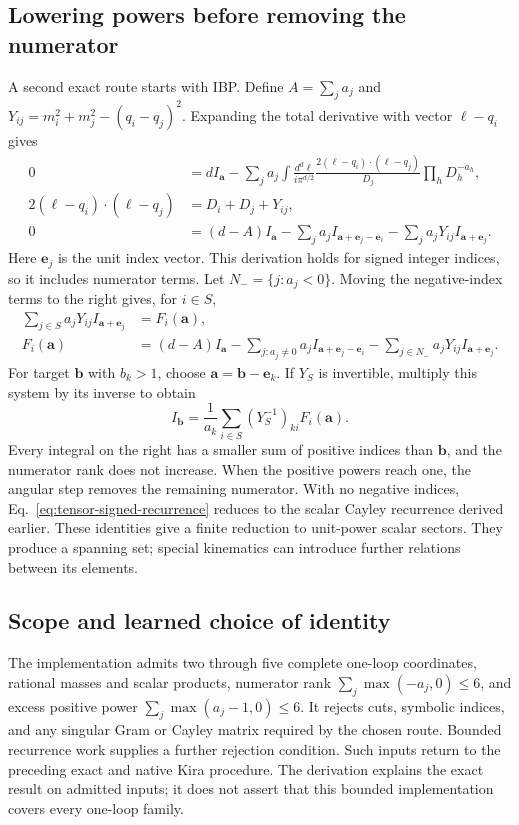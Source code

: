 \subsection{Lowering powers before removing the numerator}
A second exact route starts with IBP. Define $A=\sum_j a_j$ and $Y_{ij}=m_i^2+m_j^2-(q_i-q_j)^2$. Expanding the total derivative with vector $\ell-q_i$ gives
\begin{align}
 0&=d I_{\boldsymbol a}
 -\sum_j a_j\int\frac{d^d\ell}{i\pi^{d/2}}
 \frac{2(\ell-q_i)\cdot(\ell-q_j)}{D_j}\prod_hD_h^{-a_h},\\
 2(\ell-q_i)\cdot(\ell-q_j)&=D_i+D_j+Y_{ij},\\
 0&=(d-A)I_{\boldsymbol a}
 -\sum_j a_j I_{\boldsymbol a+\boldsymbol e_j-\boldsymbol e_i}
 -\sum_j a_jY_{ij}I_{\boldsymbol a+\boldsymbol e_j}.
 \label{eq:tensor-ibp}
\end{align}
Here $\boldsymbol e_j$ is the unit index vector. This derivation holds for signed integer indices, so it includes numerator terms. Let $N_- =\{j:a_j<0\}$. Moving the negative-index terms to the right gives, for $i\in S$,
\begin{align}
 \sum_{j\in S}a_jY_{ij}I_{\boldsymbol a+\boldsymbol e_j}&=F_i(\boldsymbol a),\\
 F_i(\boldsymbol a)&=(d-A)I_{\boldsymbol a}
 -\sum_{j:a_j\ne0}a_j I_{\boldsymbol a+\boldsymbol e_j-\boldsymbol e_i}
 -\sum_{j\in N_-}a_jY_{ij}I_{\boldsymbol a+\boldsymbol e_j}.
 \label{eq:tensor-signed-system}
\end{align}
For target $\boldsymbol b$ with $b_k>1$, choose $\boldsymbol a=\boldsymbol b-\boldsymbol e_k$. If $Y_S$ is invertible, multiply this system by its inverse to obtain
\begin{equation}
 I_{\boldsymbol b}=\frac{1}{a_k}
 \sum_{i\in S}(Y_S^{-1})_{ki}F_i(\boldsymbol a).
 \label{eq:tensor-signed-recurrence}
\end{equation}
Every integral on the right has a smaller sum of positive indices than $\boldsymbol b$, and the numerator rank does not increase. When the positive powers reach one, the angular step removes the remaining numerator. With no negative indices, Eq.~\eqref{eq:tensor-signed-recurrence} reduces to the scalar Cayley recurrence derived earlier. These identities give a finite reduction to unit-power scalar sectors. They produce a spanning set; special kinematics can introduce further relations between its elements.

\subsection{Scope and learned choice of identity}
The implementation admits two through five complete one-loop coordinates, rational masses and scalar products, numerator rank $\sum_j\max(-a_j,0)\leq6$, and excess positive power $\sum_j\max(a_j-1,0)\leq6$. It rejects cuts, symbolic indices, and any singular Gram or Cayley matrix required by the chosen route. Bounded recurrence work supplies a further rejection condition. Such inputs return to the preceding exact and native Kira procedure. The derivation explains the exact result on admitted inputs; it does not assert that this bounded implementation covers every one-loop family.

